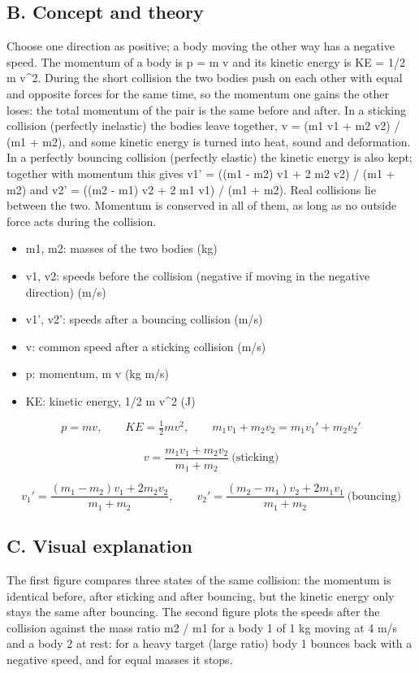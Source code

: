 \documentclass[11pt,a4paper]{article}
\begin{document}
\subsection*{B. Concept and theory}
Choose one direction as positive; a body moving the other way has a negative speed. The momentum of a body is p = m v and its kinetic energy is KE = 1/2 m v\textasciicircum{}2. During the short collision the two bodies push on each other with equal and opposite forces for the same time, so the momentum one gains the other loses: the total momentum of the pair is the same before and after. In a sticking collision (perfectly inelastic) the bodies leave together, v = (m1 v1 + m2 v2) / (m1 + m2), and some kinetic energy is turned into heat, sound and deformation. In a perfectly bouncing collision (perfectly elastic) the kinetic energy is also kept; together with momentum this gives v1' = ((m1 - m2) v1 + 2 m2 v2) / (m1 + m2) and v2' = ((m2 - m1) v2 + 2 m1 v1) / (m1 + m2). Real collisions lie between the two. Momentum is conserved in all of them, as long as no outside force acts during the collision.

\begin{itemize}[nosep]
\item m1, m2: masses of the two bodies (kg)
\item v1, v2: speeds before the collision (negative if moving in the negative direction) (m/s)
\item v1', v2': speeds after a bouncing collision (m/s)
\item v: common speed after a sticking collision (m/s)
\item p: momentum, m v (kg m/s)
\item KE: kinetic energy, 1/2 m v\textasciicircum{}2 (J)
\end{itemize}

\[ p = m v,\qquad KE = \tfrac{1}{2} m v^{2},\qquad m_1 v_1 + m_2 v_2 = m_1 v_1' + m_2 v_2' \]

\[ v = \frac{m_1 v_1 + m_2 v_2}{m_1 + m_2}\ \text{(sticking)} \]

\[ v_1' = \frac{(m_1 - m_2) v_1 + 2 m_2 v_2}{m_1 + m_2},\qquad v_2' = \frac{(m_2 - m_1) v_2 + 2 m_1 v_1}{m_1 + m_2}\ \text{(bouncing)} \]

\subsection*{C. Visual explanation}
The first figure compares three states of the same collision: the momentum is identical before, after sticking and after bouncing, but the kinetic energy only stays the same after bouncing. The second figure plots the speeds after the collision against the mass ratio m2 / m1 for a body 1 of 1 kg moving at 4 m/s and a body 2 at rest: for a heavy target (large ratio) body 1 bounces back with a negative speed, and for equal masses it stops.
\end{document}
